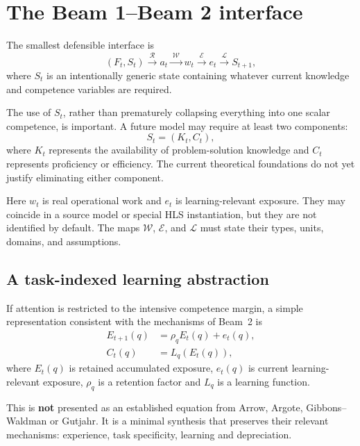 \section{The Beam 1--Beam 2 interface}

The smallest defensible interface is
\begin{equation}
(F_t,S_t)
\xrightarrow{\;\mathcal R\;}
a_t
\xrightarrow{\;\mathcal W\;}
w_t
\xrightarrow{\;\mathcal E\;}
e_t
\xrightarrow{\;\mathcal L\;}
S_{t+1},
\label{eq:interface}
\end{equation}
where \(S_t\) is an intentionally generic state containing whatever current knowledge and
competence variables are required.

The use of \(S_t\), rather than prematurely collapsing everything into one scalar competence,
is important. A future model may require at least two components:
\begin{equation}
S_t=(K_t,C_t),
\end{equation}
where \(K_t\) represents the availability of problem-solution knowledge and \(C_t\) represents
proficiency or efficiency. The current theoretical foundations do not yet justify eliminating
either component.

Here \(w_t\) is real operational work and \(e_t\) is learning-relevant exposure. They may
coincide in a source model or special HLS instantiation, but they are not identified by
default. The maps \(\mathcal W\), \(\mathcal E\), and \(\mathcal L\) must state their
types, units, domains, and assumptions.

\subsection{A task-indexed learning abstraction}

If attention is restricted to the intensive competence margin, a simple representation
consistent with the mechanisms of Beam~2 is
\begin{align}
E_{t+1}(q) &= \rho_q E_t(q) + e_t(q),\\
C_t(q) &= L_q(E_t(q)),
\label{eq:experience}
\end{align}
where \(E_t(q)\) is retained accumulated exposure, \(e_t(q)\) is current
learning-relevant exposure, \(\rho_q\) is a retention factor and \(L_q\) is a learning
function.

This is \textbf{not} presented as an established equation from Arrow, Argote, Gibbons--Waldman
or Gutjahr. It is a minimal synthesis that preserves their relevant mechanisms: experience,
task specificity, learning and depreciation.

